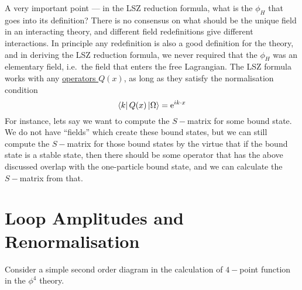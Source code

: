 \documentclass[11pt]{article}
\newcommand{\e}{\mathrm{e}}
\numberwithin{equation}{section}
\begin{document}
A very important point — in the LSZ reduction formula, what is the \(\phi_H\) that goes into its definition? There is no consensus on what should be the unique field in an interacting theory, and different field redefinitions give different interactions. In principle any redefinition is also a good definition for the theory, and in deriving the LSZ reduction formula, we never required that the \(\phi_H\) was an elementary field, i.e.\ the field that enters the free Lagrangian. The LSZ formula works with any \underline{operators \(Q(x)\)}, as long as they satisfy the normalisation condition
\begin{equation*}
    \bra{k}Q(x)\ket{\Omega} = \e^{ik\cdot x}
\end{equation*} 
For instance, lets say we want to compute the \(S-\)matrix for some bound state. We do not have ``fields'' which create these bound states, but we can still compute the \(S-\)matrix for those bound states by the virtue that if the bound state is a stable state, then there should be some operator that has the above discussed overlap with the one-particle bound state, and we can calculate the \(S-\)matrix from that. \\




\newpage
\section{Loop Amplitudes and Renormalisation}
Consider a simple second order diagram in the calculation of \(4-\)point function in the \(\phi^4\) theory. 
\begin{figure}[h]
    \centering
\end{figure}
\end{document}
